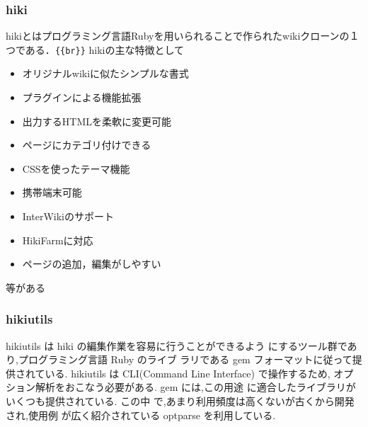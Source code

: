 \subsubsection{hiki}
hikiとはプログラミング言語Rubyを用いられることで作られたwikiクローンの１つである．\verb|{{br}}|
hikiの主な特徴として

\begin{itemize}
\item オリジナルwikiに似たシンプルな書式
\item プラグインによる機能拡張
\item 出力するHTMLを柔軟に変更可能
\item ページにカテゴリ付けできる
\item CSSを使ったテーマ機能
\item 携帯端末可能
\item InterWikiのサポート
\item HikiFarmに対応
\item ページの追加，編集がしやすい
\end{itemize}
等がある

\subsubsection{hikiutils}
hikiutils は hiki の編集作業を容易に行うことができるよう にするツール群であり,プログラミング言語 Ruby のライブ ラリである gem フォーマットに従って提供されている. 
hikiutils は CLI(Command Line Interface) で操作するため, オプション解析をおこなう必要がある.
gem には,この用途 に適合したライブラリがいくつも提供されている.
この中 で,あまり利用頻度は高くないが古くから開発され,使用例 が広く紹介されている optparse を利用している.

